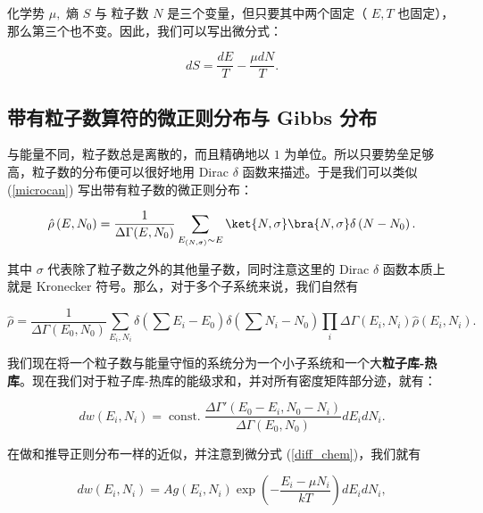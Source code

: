化学势 $\mu,$ 熵 $S$ 与 粒子数 $N$ 是三个变量，但只要其中两个固定（ $E,T $ 也固定），那么第三个也不变。因此，我们可以写出微分式：
\begin{linenomath}\begin{equation}  dS = \frac{dE}{T} - \frac{\mu dN}{T}.\label{diff_chem}\end{equation}\end{linenomath}

\subsection{带有粒子数算符的微正则分布与 Gibbs 分布}
与能量不同，粒子数总是离散的，而且精确地以 $1$ 为单位。所以只要势垒足够高，粒子数的分布便可以很好地用 Dirac $\delta$ 函数来描述。于是我们可以类似 (\ref{microcan}) 写出带有粒子数的微正则分布：
\begin{linenomath}\begin{equation}
\hat{\rho}\left( E,N_0 \right) = \frac{1}{\Delta \Gamma(E,N_0)} \sum_{E_{(N,\sigma)}\sim E} \ket{N,\sigma}\bra{N,\sigma}\delta\left( N-N_0 \right).
\end{equation}\end{linenomath}
其中 $\sigma$ 代表除了粒子数之外的其他量子数，同时注意这里的 Dirac $\delta$ 函数本质上就是 Kronecker 符号。那么，对于多个子系统来说，我们自然有
\begin{linenomath}\begin{equation}
  \hat{\rho} = \frac{1}{\Delta\Gamma\left( E_0,N_0 \right)} \sum_{E_i,N_i} \delta\left( \sum E_i -E_0 \right)\delta\left(\sum N_i - N_0\right) \prod_i\Delta\Gamma(E_i,N_i) \hat{\rho}\left( E_i, N_i \right).
\end{equation}\end{linenomath}
我们现在将一个粒子数与能量守恒的系统分为一个小子系统和一个大\textbf{粒子库-热库}。现在我们对于粒子库-热库的能级求和，并对所有密度矩阵部分迹，就有：
\begin{linenomath}\begin{equation}
  dw(E_i,N_i) = \operatorname{const.} \frac{\Delta \Gamma'(E_0-E_i,N_0-N_i)}{\Delta \Gamma(E_0,N_0)} dE_i dN_i.
\end{equation}\end{linenomath}
在做和推导正则分布一样的近似，并注意到微分式 (\ref{diff_chem})，我们就有
\begin{linenomath}\begin{equation}
  dw(E_i,N_i) = A g(E_i,N_i)\exp\left( -\frac{E_i-\mu N_i}{kT} \right) dE_i dN_i,
\end{equation}\end{linenomath}
